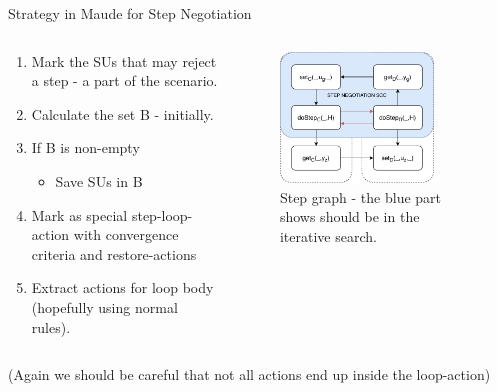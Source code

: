 \documentclass{beamer}
\begin{document}
\begin{frame}{Strategy in Maude for Step Negotiation}
    \begin{columns}[T] 
        \begin{column}{.48\textwidth}
            \begin{enumerate}
                \item Mark the SUs that may reject a step - a part of the scenario.
                \item Calculate the set B - initially.
                \item If B is non-empty
                \begin{itemize}
                    \item Save SUs in B
                \end{itemize}
                \item Mark as special step-loop-action with convergence criteria and restore-actions
                \item Extract actions for loop body (hopefully using normal rules).
            \end{enumerate}  
        \end{column}
    \hfill%
        \begin{column}{.48\textwidth}
            \begin{figure}    
                \includegraphics[width=0.8\textwidth]{images/step_scenario_graph.pdf}
                \caption{Step graph - the blue part shows should be in the iterative search.}
            \end{figure}  
        \end{column}
    \end{columns}
    (Again we should be careful that not all actions end up inside the loop-action)
\end{frame}
\end{document}
